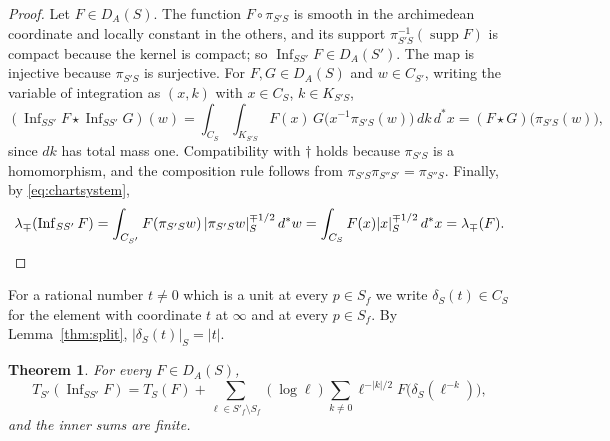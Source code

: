 \documentclass[11pt]{amsart}
\newtheorem{theorem}{Theorem}[section]
\theoremstyle{definition}
\theoremstyle{remark}
\newcommand{\dstar}{\,d^{*}}
\newcommand{\supp}{\operatorname{supp}}
\newcommand{\Inf}{\operatorname{Inf}}
\newcommand{\DA}{D_A}
\begin{document}
\begin{proof}
Let $F\in\DA(S)$.  The function $F\circ\pi_{S'S}$ is smooth in the
archimedean coordinate and locally constant in the others, and its support
$\pi_{S'S}^{-1}(\supp F)$ is compact because the kernel is compact; so
$\Inf_{SS'}F\in\DA(S')$.  The map is injective because $\pi_{S'S}$ is
surjective.  For $F,G\in\DA(S)$ and $w\in C_{S'}$, writing the variable of
integration as $(x,k)$ with $x\in C_S$, $k\in K_{S'S}$,
\[
(\Inf_{SS'}F\star\Inf_{SS'}G)(w)=\int_{C_S}\int_{K_{S'S}}F(x)\,
G\bigl(x^{-1}\pi_{S'S}(w)\bigr)\,dk\dstar x=(F\star G)\bigl(\pi_{S'S}(w)\bigr),
\]
since $dk$ has total mass one.  Compatibility with $\dagger$ holds because
$\pi_{S'S}$ is a homomorphism, and the composition rule follows from
$\pi_{S'S}\pi_{S''S'}=\pi_{S''S}$.  Finally, by \eqref{eq:chartsystem},
\[
\lambda_{\mp}(\Inf_{SS'}F)=\int_{C_{S'}}F(\pi_{S'S}w)\,|\pi_{S'S}w|_{S}^{\mp1/2}
\dstar w=\int_{C_S}F(x)|x|_S^{\mp1/2}\dstar x=\lambda_{\mp}(F).\qedhere
\]
\end{proof}

For a rational number $t\ne0$ which is a unit at every $p\in S_f$ we write
$\delta_S(t)\in C_S$ for the element with coordinate $t$ at $\infty$ and at
every $p\in S_f$.  By Lemma~\ref{thm:split}, $|\delta_S(t)|_S=|t|$.

\begin{theorem}\label{thm:chartcomp}
For every $F\in\DA(S)$,
\begin{equation}\label{eq:chartcomp}
T_{S'}(\Inf_{SS'}F)=T_S(F)+\sum_{\ell\in S'_f\setminus S_f}(\log\ell)
\sum_{k\ne0}\ell^{-|k|/2}F\bigl(\delta_S(\ell^{-k})\bigr),
\end{equation}
and the inner sums are finite.
\end{theorem}
\end{document}
